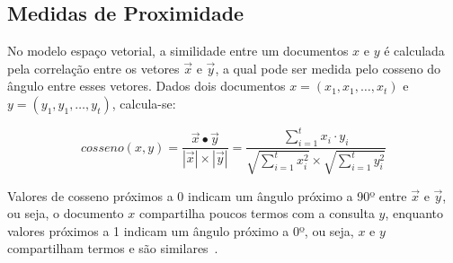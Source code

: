 
\subsection{Medidas de Proximidade}
\label{subsec:MedidasProximidade}
No modelo espaço vetorial, a similidade entre um documentos $x$ e $y$ é calculada pela correlação entre os vetores $\vec{x}$ e $\vec{y}$, a qual pode ser medida pelo cosseno do  ângulo entre esses vetores. Dados dois documentos $x = (x_1, x_1, \dots, x_t)$ e $y = (y_1, y_1, \dots, y_t)$, calcula-se: 




\begin{equation}
cosseno(x, y) = \frac{ \vec{x} \bullet \vec{y} }
                   { |\vec{x}| \times | \vec{y}|}
            = \frac{ \sum_{i=1}^{t} x_i \cdot y_i}
                   { \sqrt{\sum_{i=1}^{t} x_i^2} \times \sqrt{\sum_{i=1}^{t} y_i^2 } }                      \label{equ:cosine}
\end{equation} 


Valores de cosseno próximos a 0 indicam um ângulo próximo a 90º entre $\vec{x}$ e $\vec{y}$, ou seja, o documento $x$ compartilha poucos termos com a consulta $y$, enquanto valores próximos a 1 indicam um ângulo próximo a 0º, ou seja, $x$ e $y$ compartilham termos e são similares~\cite{Tan2005,Feldman2006}.


